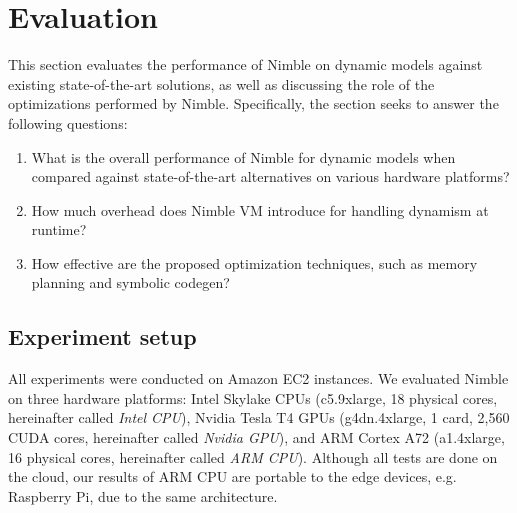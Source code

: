 \section{Evaluation}
\label{sec:eval}

This section evaluates the performance of Nimble on dynamic models against existing state-of-the-art solutions, as well as discussing the role of the optimizations performed by Nimble. Specifically, the section seeks to answer the following questions:
\begin{enumerate}
    \item What is the overall performance of Nimble for dynamic models when compared against state-of-the-art alternatives on various hardware platforms?
    \item How much overhead does Nimble VM introduce for handling dynamism at runtime?
    \item How effective are the proposed optimization techniques, such as memory planning and symbolic codegen?
\end{enumerate}

\subsection{Experiment setup}
\label{sec:eval:setup}

All experiments were conducted on Amazon EC2 instances. We evaluated Nimble on three hardware platforms: Intel Skylake CPUs (c5.9xlarge, 18 physical cores, hereinafter called {\em Intel CPU}), Nvidia Tesla T4 GPUs (g4dn.4xlarge, 1 card, 2,560 CUDA cores, hereinafter called {\em Nvidia GPU}), and ARM Cortex A72 (a1.4xlarge, 16 physical cores, hereinafter called {\em ARM CPU}). Although all tests are done on the cloud, our results of ARM CPU are portable to the edge devices, e.g. Raspberry Pi, due to the same architecture. %

